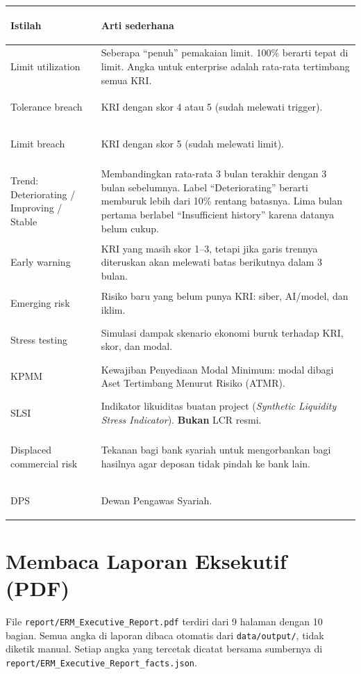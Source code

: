 \documentclass[11pt,a4paper]{article}
\newcommand{\file}[1]{\texttt{\small #1}}
\begin{document}
\begin{longtable}{>{\bfseries\raggedright\arraybackslash}p{3.8cm}>{\raggedright\arraybackslash}p{11.1cm}}
\toprule
Istilah & Arti sederhana \\
\midrule
\endhead
Limit utilization & Seberapa ``penuh'' pemakaian limit. 100\% berarti tepat di limit. Angka untuk enterprise adalah rata-rata tertimbang semua KRI. \\
Tolerance breach & KRI dengan skor 4 atau 5 (sudah melewati trigger). \\
Limit breach & KRI dengan skor 5 (sudah melewati limit). \\
Trend: Deteriorating / Improving / Stable & Membandingkan rata-rata 3 bulan terakhir dengan 3 bulan sebelumnya. Label ``Deteriorating'' berarti memburuk lebih dari 10\% rentang batasnya. Lima bulan pertama berlabel ``Insufficient history'' karena datanya belum cukup. \\
Early warning & KRI yang masih skor 1--3, tetapi jika garis trennya diteruskan akan melewati batas berikutnya dalam 3 bulan. \\
Emerging risk & Risiko baru yang belum punya KRI: siber, AI/model, dan iklim. \\
Stress testing & Simulasi dampak skenario ekonomi buruk terhadap KRI, skor, dan modal. \\
KPMM & Kewajiban Penyediaan Modal Minimum: modal dibagi Aset Tertimbang Menurut Risiko (ATMR). \\
SLSI & Indikator likuiditas buatan project (\emph{Synthetic Liquidity Stress Indicator}). \textbf{Bukan} LCR resmi. \\
Displaced commercial risk & Tekanan bagi bank syariah untuk mengorbankan bagi hasilnya agar deposan tidak pindah ke bank lain. \\
DPS & Dewan Pengawas Syariah. \\
\bottomrule
\end{longtable}
\section{Membaca Laporan Eksekutif (PDF)}\label{sec:report}

File \file{report/ERM\_\allowbreak{}Executive\_\allowbreak{}Report.pdf} terdiri dari 9 halaman dengan 10 bagian. Semua angka di laporan dibaca otomatis dari \file{data/output/}, tidak diketik manual. Setiap angka yang tercetak dicatat bersama sumbernya di \file{report/ERM\_\allowbreak{}Executive\_\allowbreak{}Report\_\allowbreak{}facts.json}.
\end{document}
